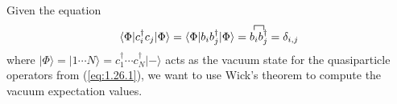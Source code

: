 \documentclass[12pt]{article}
\newcommand{\la}{\langle}
\newcommand{\ra}{\rangle}
\newcommand{\da}{\dagger}
\begin{document}
\begin{itshape}
    Given the equation
    \begin{align}
	    \la \Phi | c_i^\da c_j | \Phi \ra
        = \la \Phi | b_i b_j^\da | \Phi \ra
        = \contraction{}{b_i}{}{b_j^\da} b_i b_j^\da
        = \delta_{i,j}\label{eq:1.28.1}
    \end{align}
    where $|\Phi\ra = |1 \cdots N\ra = c_1^\da \cdots c_N^\da |-\ra$ 
    acts as the vacuum state for the quasiparticle operators
    from (\ref{eq:1.26.1}), we want to use Wick's theorem to compute the
    vacuum expectation values.
\end{itshape}

\begin{tcolorbox}[title = Exercise 1.28. // Solution, breakable]
    
\end{tcolorbox}
\end{document}
